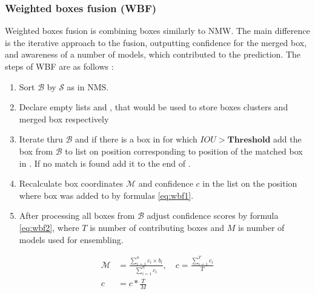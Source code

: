 \subsubsection{Weighted boxes fusion (WBF)}
Weighted boxes fusion is combining boxes similarly to NMW. The main difference is the iterative approach to the fusion, outputting confidence for the merged box, and awareness of a number of models, which contributed to the prediction.
The steps of WBF are as follows \cite{Solovyev2019}:
\begin{enumerate}
    \item Sort $\mathcal{B}$ by $\mathcal{S}$ as in NMS.
    \item Declare empty lists  and , that would be used to store boxes clusters and merged box respectively
    \item Iterate thru $\mathcal{B}$ and if there is a box in  for which $IOU > \mathbf{Threshold}$ add the box from $\mathcal{B}$ to list  on position corresponding to position of the matched box in . If no match is found add it to the end of .
    \item Recalculate box coordinates $\mathcal{M}$ and confidence $c$ in the list  on the position where box was added to  by formulas \ref{eq:wbf1}.
    \item After processing all boxes from $\mathcal{B}$ adjust confidence scores by formula \ref{eq:wbf2}, where $T$ is number of contributing boxes and $M$ is number of models used for ensembling.
\end{enumerate}
\begin{align}
    \mathcal{M} & = \frac{\sum_{i=1}^n c_i \times b_i}{\sum_{i=1}^n c_i} ,\quad c=\frac{\sum_{i=1}^{T}c_i}{T} \label{eq:wbf1} \\
    c           & = c * \frac{T}{M} \label{eq:wbf2}
\end{align}
